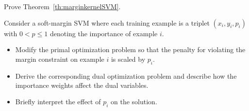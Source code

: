 \begin{myexercise}\label{ex:kernelSVMbound}
Prove Theorem~\ref{th:marginkernelSVM}.
\end{myexercise}





\begin{myexercise}
Consider a soft-margin SVM where each training example is a triplet $(x_i,y_i,p_i)$ with
$0 < p \le 1$ denoting the importance of example $i$. 
\begin{itemize}
\item[(a)] Modify the primal optimization problem so that the penalty for violating the margin constraint on example $i$ is scaled by $p_i$.
\item[(b)] Derive the corresponding dual optimization problem and describe how the importance weights affect the dual variables.
\item[(c)] Briefly interpret the effect of $p_i$ on the solution. 
\end{itemize}

\end{myexercise}


